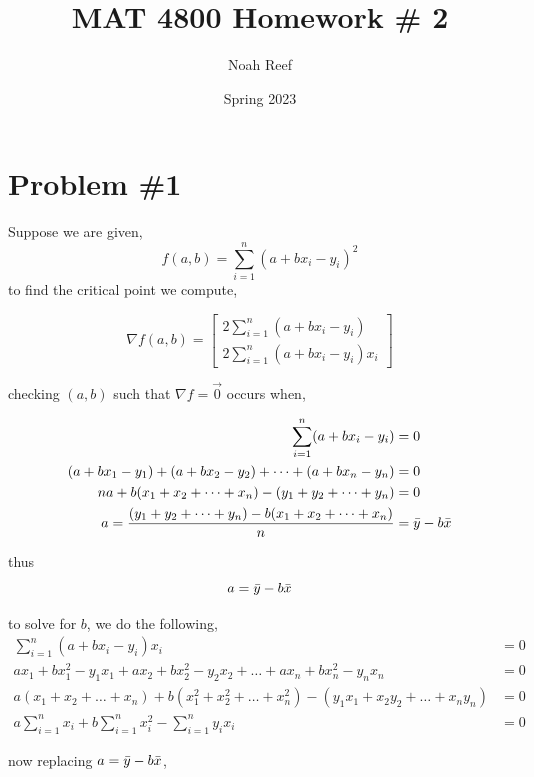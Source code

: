 \documentclass{article}
\title{MAT 4800 Homework \# 2}
\author{Noah Reef }
\date{Spring 2023}
\begin{document}
\maketitle
\section*{Problem \#1}

Suppose we are given,
\begin{equation*}
    f(a,b) = \sum_{i=1}^n(a + bx_i - y_i)^2
\end{equation*}
to find the critical point we compute,

\begin{equation*}
    \nabla f(a,b) = \begin{bmatrix}
    2\sum_{i=1}^n(a + bx_i - y_i) \\
    2\sum_{i=1}^n(a + bx_i - y_i)x_i
    \end{bmatrix}
\end{equation*}

checking $(a,b)$ such that $\nabla f = \vec{0}$ occurs when,

\begin{align*}
    \sum_{i=1}^n(a + bx_i - y_i) &= 0 \\
    (a + bx_1 - y_1) + (a + bx_2 - y_2) + \dots + (a + bx_n - y_n) &= 0 \\
    na + b(x_1 + x_2 + \dots + x_n) - (y_1 + y_2 + \dots + y_n) &= 0 \\
    a = \frac{(y_1 + y_2 + \dots + y_n) - b(x_1 + x_2 + \dots + x_n)}{n} &= \Bar{y} - b\Bar{x}
\end{align*}

thus 
\begin{equation*}
    a = \Bar{y} - b\Bar{x}
\end{equation*}

to solve for $b$, we do the following,
\begin{align*}
    \sum_{i=1}^n(a + bx_i - y_i)x_i &= 0 \\
     ax_1 + bx_1^2 - y_1x_1 + ax_2 + bx_2^2 - y_2x_2 + \dots + ax_n + bx_n^2 - y_nx_n &= 0 \\
     a(x_1 + x_2 + \dots + x_n) + b(x_1^2 + x_2^2 + \dots + x_n^2) - (y_1x_1 + x_2y_2 + \dots + x_ny_n) &= 0 \\
     a\sum_{i=1}^nx_i + b\sum_{i=1}^nx_i^2 - \sum_{i=1}^ny_ix_i &= 0
\end{align*}

now replacing $a =  \Bar{y} - b\Bar{x}$,
\end{document}
